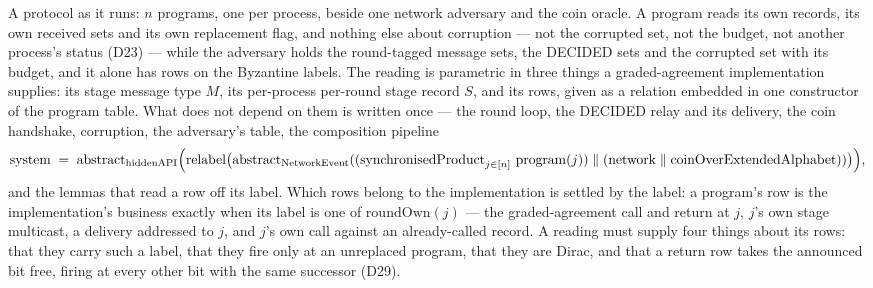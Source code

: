 \begin{definition}
  \label{def:aba-flat-reading}
  \leanok
  A protocol as it runs: $n$ programs, one per process, beside one network adversary and the coin oracle.
  A program reads its own records, its own received sets and its own replacement flag, and nothing else about corruption --- not the corrupted set, not the budget, not another process's status (D23) --- while the adversary holds the round-tagged message sets, the DECIDED sets and the corrupted set with its budget, and it alone has rows on the Byzantine labels.
  The reading is parametric in three things a graded-agreement implementation supplies: its stage message type $M$, its per-process per-round stage record $S$, and its rows, given as a relation embedded in one constructor of the program table.
  What does not depend on them is written once --- the round loop, the DECIDED relay and its delivery, the coin handshake, corruption, the adversary's table, the composition pipeline
  \[
    \mathrm{system} \;=\;
      \mathrm{abstract}_{\mathrm{hiddenAPI}}\Bigl(
        \mathrm{relabel}\bigl(\mathrm{abstract}_{\mathrm{NetworkEvent}}(
          (\mathrm{synchronisedProduct}_{j \in [n]}\ \mathrm{program}(j)) \parallel (\mathrm{network} \parallel \mathrm{coinOverExtendedAlphabet}))\bigr)\Bigr),
  \]
  and the lemmas that read a row off its label.
  Which rows belong to the implementation is settled by the label: a program's row is the implementation's business exactly when its label is one of $\mathrm{roundOwn}(j)$ --- the graded-agreement call and return at $j$, $j$'s own stage multicast, a delivery addressed to $j$, and $j$'s own call against an already-called record.
  A reading must supply four things about its rows: that they carry such a label, that they fire only at an unreplaced program, that they are Dirac, and that a return row takes the announced bit free, firing at every other bit with the same successor (D29).

\end{definition}
